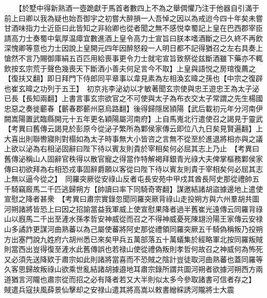 　　【於墅中得新熟酒一壺跪獻于馬首者數四上不為之舉倜懼乃注于他器自引滿于前上曰卿以我為疑也始吾御宇之初嘗大醉損一人吾悼之因以為戒迨今四十年矣未嘗甘酒味指力士近臣曰此皆知之非紿卿也從者聞之無不感悦幸蜀記上皇在巴西郡宰臣請高力士奏蜀中氣厚温瘴宜數進酒上皇令高力士宣旨曰朕本嗜酒斷之已久終不再飲深愧卿等意也力士因說上皇開元四年因醉怒殺一人明日都不記得猶召之左右具奏上愴然不言乃賜御庫絹五百匹用給喪事更令力士就宅宣旨致祭從兹斷酒雖下藥亦不輒飲按玄宗荒于聲色幾喪天下斷酒小善夫何足言今不取】上皇與語悦之房琯復薦之【復扶又翻】即日拜門下侍郎同平章事以韋見素為左相渙玄暐之孫也【中宗之復辟也崔玄暐之功列于五王】　初京兆李泌幼以才敏著聞玄宗使與忠王遊忠王為太子泌已長【長知兩翻】上書言事玄宗欲官之不可使與太子為布衣交太子常謂之先生楊國忠惡之奏徙蘄春【蘄春郡蘄州惡烏路翻】後得歸隱居頴陽【武后載初元年分河南伊闕嵩陽置武臨縣開元十五年更名穎陽屬河南府】上自馬嵬北行遣使召之謁見于靈武　【考異曰舊傳云謁見於彭原今從泌子繁所為鄴侯家傳云即位八九日矣見賢遍翻】上大喜出則聯轡寢則對榻如為太子時事無大小皆咨之言無不從至於進退將相亦與之議上欲以泌為右相泌固辭曰陛下待以賓友則貴於宰相矣何必屈其志上乃止　【考異曰舊傳泌稱山人固辭官秩得以散官寵之得當作特解褐拜銀青光祿大夫俾掌樞務鄴侯家傳曰初欲拜為右相恐戎事固辭爵願以客從曰陛下待以賓友則貴于宰相矣何必屈其志上無以逼今從之】　同羅突厥從安祿山反者屯長安苑中甲戍其酋長阿史那從禮帥五千騎竊廄馬二千匹逃歸朔方【帥讀曰率下同騎奇寄翻】謀邀結諸胡盜據邊地上遣使宣慰之降者甚衆　【考異曰肅宗實錄忽聞同羅突厥背祿山走投朔方與六州羣胡共圖河朔諸將皆恐上曰因之招諭當益我軍威上使宣慰果降者過半舊崔光遠傳云同羅背祿山以廐馬二千出至滻水孫孝哲安神威從而召之不得神威憂死陳翃汾陽王家傳云安禄山多譎詐更謀河曲熟蕃以為己屬使蕃將阿史那從禮領同羅突厥五千騎偽稱叛乃投朔方出塞門說九姓府六胡州悉已來矣甲兵五萬部落五十萬蟻集於經略軍北按同羅叛賊則當西出豈得復至滻水此舊傳誤也若禄山使從禮偽叛則孝哲何故召之神威何為怖死又必須先送降欵于肅宗如此則諸將當喜而不恐賊之陰計豈徒取河曲熟蕃也蓋同羅等久客思歸故叛祿山欲乘世亂結諸胡據邉地耳肅宗錄所謂共圖河朔者欲據河朔西方兩道猶言河隴也肅宗從而招之必有降者若又大半則似太多今參取諸書可信者存之】　賊遣兵寇扶風薛景仙擊却之安禄山遣其將高嵩以敕書繒綵誘河隴將士大震

